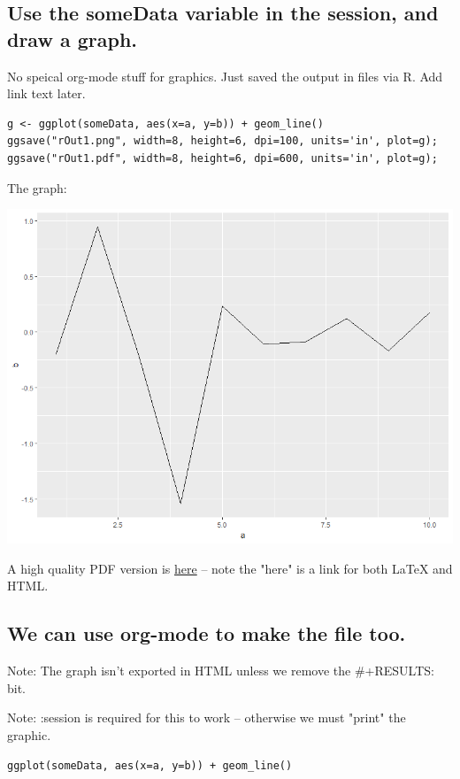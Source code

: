 \documentclass[11pt]{article}
\begin{document}
\subsection{Use the someData variable in the session, and draw a graph.}
\label{sec-8-2}

No speical org-mode stuff for graphics.  Just saved the output in files via R.  Add link text later.

\begin{verbatim}
g <- ggplot(someData, aes(x=a, y=b)) + geom_line()
ggsave("rOut1.png", width=8, height=6, dpi=100, units='in', plot=g);
ggsave("rOut1.pdf", width=8, height=6, dpi=600, units='in', plot=g);
\end{verbatim}

The graph:

\includegraphics[width=.9\linewidth]{rOut1.png}

A high quality PDF version is \href{rOut1.pdf}{here} -- note the "here" is a link for both \LaTeX{} and HTML.

\subsection{We can use org-mode to make the file too.}
\label{sec-8-3}

Note: The graph isn't exported in HTML unless we remove the \#+RESULTS: bit.

Note: :session is required for this to work -- otherwise we must "print" the graphic.

\begin{verbatim}
ggplot(someData, aes(x=a, y=b)) + geom_line()
\end{verbatim}
\end{document}
